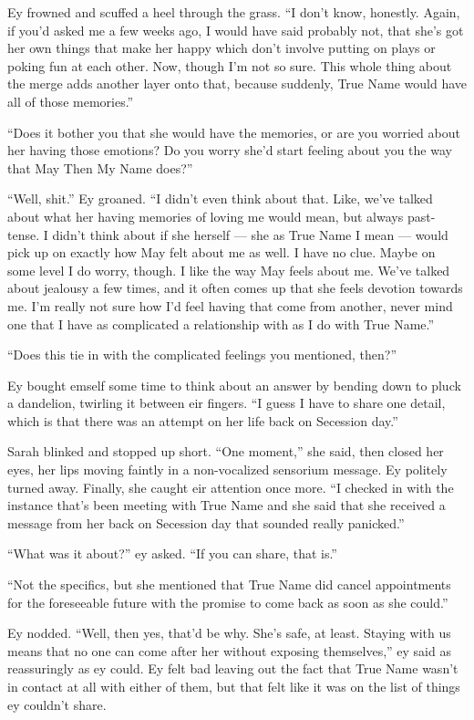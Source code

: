 Ey frowned and scuffed a heel through the grass. ``I don't know, honestly. Again, if you'd asked me a few weeks ago, I would have said probably not, that she's got her own things that make her happy which don't involve putting on plays or poking fun at each other. Now, though I'm not so sure. This whole thing about the merge adds another layer onto that, because suddenly, True Name would have all of those memories.''

``Does it bother you that she would have the memories, or are you worried about her having those emotions? Do you worry she'd start feeling about you the way that May Then My Name does?''

``Well, shit.'' Ey groaned. ``I didn't even think about that. Like, we've talked about what her having memories of loving me would mean, but always past-tense. I didn't think about if she herself — she as True Name I mean — would pick up on exactly how May felt about me as well. I have no clue. Maybe on some level I do worry, though. I like the way May feels about me. We've talked about jealousy a few times, and it often comes up that she feels devotion towards me. I'm really not sure how I'd feel having that come from another, never mind one that I have as complicated a relationship with as I do with True Name.''

``Does this tie in with the complicated feelings you mentioned, then?''

Ey bought emself some time to think about an answer by bending down to pluck a dandelion, twirling it between eir fingers. ``I guess I have to share one detail, which is that there was an attempt on her life back on Secession day.''

Sarah blinked and stopped up short. ``One moment,'' she said, then closed her eyes, her lips moving faintly in a non-vocalized sensorium message. Ey politely turned away. Finally, she caught eir attention once more. ``I checked in with the instance that's been meeting with True Name and she said that she received a message from her back on Secession day that sounded really panicked.''

``What was it about?'' ey asked. ``If you can share, that is.''

``Not the specifics, but she mentioned that True Name did cancel appointments for the foreseeable future with the promise to come back as soon as she could.''

Ey nodded. ``Well, then yes, that'd be why. She's safe, at least. Staying with us means that no one can come after her without exposing themselves,'' ey said as reassuringly as ey could. Ey felt bad leaving out the fact that True Name wasn't in contact at all with either of them, but that felt like it was on the list of things ey couldn't share.

